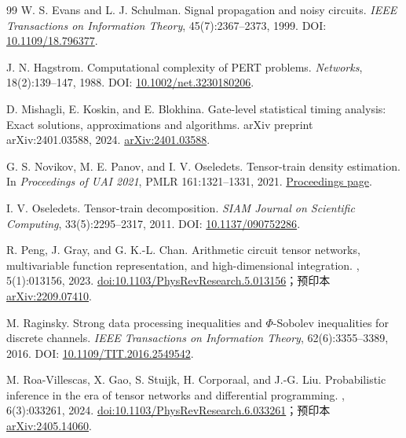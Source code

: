 \documentclass[a4paper,11pt]{article}
\theoremstyle{definition}
\newcommand{\1}{\mathbf 1}
\begin{document}
\begin{thebibliography}{99}
W. S. Evans and L. J. Schulman.
\newblock Signal propagation and noisy circuits.
\newblock \emph{IEEE Transactions on Information Theory}, 45(7):2367--2373,
1999.
\newblock DOI: \href{https://doi.org/10.1109/18.796377}{10.1109/18.796377}.

J. N. Hagstrom.
\newblock Computational complexity of PERT problems.
\newblock \emph{Networks}, 18(2):139--147, 1988.
\newblock DOI: \href{https://doi.org/10.1002/net.3230180206}
{10.1002/net.3230180206}.

D. Mishagli, E. Koskin, and E. Blokhina.
\newblock Gate-level statistical timing analysis: Exact solutions,
approximations and algorithms.
\newblock arXiv preprint arXiv:2401.03588, 2024.
\newblock \href{https://arxiv.org/abs/2401.03588}{arXiv:2401.03588}.

G. S. Novikov, M. E. Panov, and I. V. Oseledets.
\newblock Tensor-train density estimation.
\newblock In \emph{Proceedings of UAI 2021}, PMLR 161:1321--1331, 2021.
\newblock \href{https://proceedings.mlr.press/v161/novikov21a.html}
{Proceedings page}.

I. V. Oseledets.
\newblock Tensor-train decomposition.
\newblock \emph{SIAM Journal on Scientific Computing}, 33(5):2295--2317, 2011.
\newblock DOI: \href{https://doi.org/10.1137/090752286}{10.1137/090752286}.

R. Peng, J. Gray, and G. K.-L. Chan.
\newblock Arithmetic circuit tensor networks, multivariable function
representation, and high-dimensional integration.
, 5(1):013156, 2023.
\newblock \href{https://doi.org/10.1103/PhysRevResearch.5.013156}%
{doi:10.1103/PhysRevResearch.5.013156}；预印本
\href{https://arxiv.org/abs/2209.07410}{arXiv:2209.07410}.

M. Raginsky.
\newblock Strong data processing inequalities and $\Phi$-Sobolev inequalities
for discrete channels.
\newblock \emph{IEEE Transactions on Information Theory}, 62(6):3355--3389,
2016.
\newblock DOI: \href{https://doi.org/10.1109/TIT.2016.2549542}
{10.1109/TIT.2016.2549542}.

M. Roa-Villescas, X. Gao, S. Stuijk, H. Corporaal, and J.-G. Liu.
\newblock Probabilistic inference in the era of tensor networks and
differential programming.
, 6(3):033261, 2024.
\newblock \href{https://doi.org/10.1103/PhysRevResearch.6.033261}%
{doi:10.1103/PhysRevResearch.6.033261}；预印本
\href{https://arxiv.org/abs/2405.14060}{arXiv:2405.14060}.


\end{thebibliography}
\end{document}
